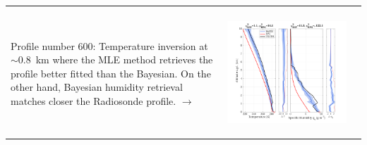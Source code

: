 \documentclass[landscape,paperwidth=1189mm,paperheight=841mm,fontscale=0.4,margin=.7cm]{baposter}
\begin{document}
\begin{poster}
{\begin{tabular}{lcc}
\begin{minipage}{0.35\linewidth}
\begin{center}
	\end{center}
\end{minipage}\\
\vspace{+.5em}
\begin{minipage}{0.18\linewidth}
	\colouredcircle \hspace{2em} Profile number 600: Temperature inversion at $\sim$0.8~km where the MLE method retrieves the profile better fitted than the Bayesian. On the other hand, Bayesian humidity retrieval matches closer the Radiosonde profile. $\rightarrow$
\end{minipage}
	&
\begin{minipage}{0.35\linewidth}
	\begin{center}             
		\includegraphics[width=1.25\linewidth,height=0.19\textheight]{Profile_600_BAY.png}
	\end{center}
\end{minipage}
&
\begin{minipage}{0.35\linewidth}
	\begin{center}             

\end{center}
\end{minipage}
\end{tabular}}
\end{poster}
\end{document}
